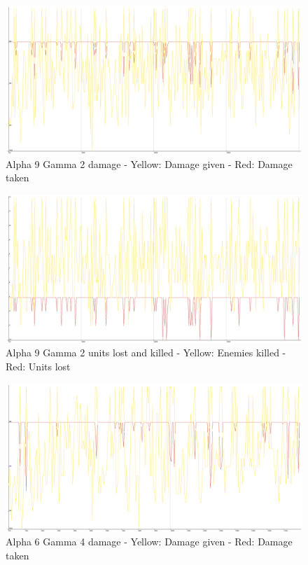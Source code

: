 \begin{figure}
\includegraphics[angle=-90, scale=0.25]{Figures/learningrate/A9G2/damage.png}
\caption{Alpha 9 Gamma 2 damage - Yellow: Damage given - Red: Damage taken}
\label{fig:a9g2_damage}
\end{figure}


\begin{figure}
\includegraphics[angle=-90, scale=0.25]{Figures/learningrate/A9G2/units_lost_and_killed.png}
\caption{Alpha 9 Gamma 2 units lost and killed - Yellow: Enemies killed - Red: Units lost}
\label{fig:a9g2_units lost and killed}
\end{figure}
	
\begin{figure}
\includegraphics[angle=-90, scale=0.25]{Figures/learningrate/A6G4/damage.png}
\caption{Alpha 6 Gamma 4 damage - Yellow: Damage given - Red: Damage taken}
\label{fig:a6g4_damage}
\end{figure}	
			


